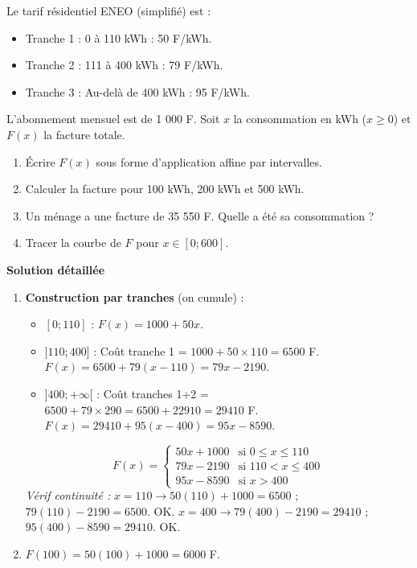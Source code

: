 \documentclass[11pt]{article}
\begin{document}
\begin{exoresolu}
    Le tarif résidentiel ENEO (simplifié) est :
    \begin{itemize}
        \item Tranche 1 : 0 à 110 kWh : 50 F/kWh.
        \item Tranche 2 : 111 à 400 kWh : 79 F/kWh.
        \item Tranche 3 : Au-delà de 400 kWh : 95 F/kWh.
    \end{itemize}
    L'abonnement mensuel est de 1 000 F. Soit $x$ la consommation en kWh ($x \ge 0$) et $F(x)$ la facture totale.
    \begin{enumerate}
        \item Écrire $F(x)$ sous forme d'application affine par intervalles.
        \item Calculer la facture pour 100 kWh, 200 kWh et 500 kWh.
        \item Un ménage a une facture de 35 550 F. Quelle a été sa consommation ?
        \item Tracer la courbe de $F$ pour $x \in [0; 600]$.
    \end{enumerate}
    \tcblower
    \textbf{Solution détaillée}
    \begin{enumerate}
        \item \textbf{Construction par tranches} (on cumule) :
        \begin{itemize}
            \item $[0; 110]$ : $F(x) = 1000 + 50x$.
            \item $]110; 400]$ : Coût tranche 1 = $1000 + 50\times110 = 6500$ F.
            $F(x) = 6500 + 79(x-110) = 79x - 2190$.
            \item $]400; +\infty[$ : Coût tranches 1+2 = $6500 + 79\times290 = 6500 + 22910 = 29410$ F.
            $F(x) = 29410 + 95(x-400) = 95x - 8590$.
        \end{itemize}
        \[
        F(x) = \begin{cases}
        50x + 1000 & \text{si } 0 \le x \le 110 \\
        79x - 2190 & \text{si } 110 < x \le 400 \\
        95x - 8590 & \text{si } x > 400
        \end{cases}
        \]
        \textit{Vérif continuité :} $x=110 \to 50(110)+1000=6500$ ; $79(110)-2190=6500$. OK. $x=400 \to 79(400)-2190=29410$ ; $95(400)-8590=29410$. OK.
        \item $F(100) = 50(100)+1000 = 6000$ F.

\end{enumerate}
\end{exoresolu}
\end{document}
